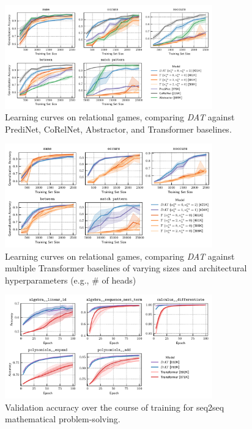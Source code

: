\documentclass[letterpaper]{article}
\begin{document}
\thispagestyle{empty} %

\begin{figure}
    \centering
    \includegraphics[width=0.8\textwidth]{figs/experiments/relgames/relgames_learning_curves_baseline_comparisons.pdf}
    \caption{Learning curves on relational games, comparing \textit{DAT} against PrediNet, CoRelNet, Abstractor, and Transformer baselines.}
\end{figure}

\begin{figure}
    \centering
    \includegraphics[width=0.8\textwidth]{figs/experiments/relgames/relgames_learning_curves_transformer_comparison.pdf}
    \caption{Learning curves on relational games, comparing \textit{DAT} against multiple Transformer baselines of varying sizes and architectural hyperparameters (e.g., \# of heads)}
\end{figure}

\begin{figure}
    \centering
    \includegraphics[width=0.8\textwidth]{figs/experiments/math/math_training_curves_interpolation.pdf}
    \caption{Validation accuracy over the course of training for seq2seq mathematical problem-solving.}
\end{figure}
\end{document}
